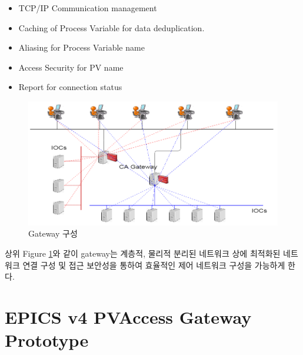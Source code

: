 \documentclass[11pt
  , a4paper
  , article
  , oneside
]{memoir}
\begin{document}
\begin{itemize}
	\item TCP/IP Communication management
	\item Caching of Process Variable for data deduplication.
	\item Aliasing for Process Variable name
	\item Access Security for PV name
	\item Report for connection status
\end{itemize}
 
\begin{figure}[!htb]
	\centering
	\includegraphics[width=1\textwidth]{./images/gateway.png}
	\caption{
		Gateway 구성
	}
	\label{fig:gateway}   
\end{figure}

상위 Figure \ref{fig:gateway}와 같이 gateway는 계층적, 물리적 분리된 네트워크 상에 최적화된 네트워크 연결 구성 및 접근 보안성을 통하여 효율적인 제어 네트워크 구성을 가능하게 한다.


\chapter{EPICS v4 PVAccess Gateway Prototype}
\end{document}
